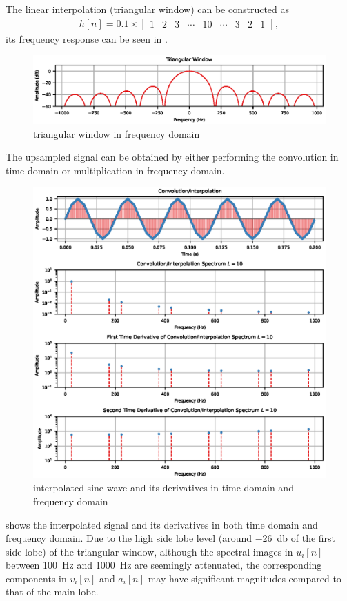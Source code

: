 The linear interpolation (triangular window) can be constructed as
\begin{gather}
h[n]=0.1\times\begin{bmatrix}
1&2&3&\cdots&10&\cdots&3&2&1
\end{bmatrix},
\end{gather}
its frequency response can be seen in .
\begin{figure}[ht]
\centering
\includegraphics{PIC/TriangularWindow}
\caption{triangular window in frequency domain}\label{fig:tri_window}
\end{figure}

The upsampled signal can be obtained by either performing the convolution in time domain or multiplication in frequency domain.
\begin{figure}[ht]
\centering
\includegraphics{PIC/Convolution}
\caption{interpolated sine wave and its derivatives in time domain and frequency domain}\label{fig:interpolated}
\end{figure}
 shows the interpolated signal and its derivatives in both time domain and frequency domain. Due to the high side lobe level (around \SI{-26}{\decibel} of the first side lobe) of the triangular window, although the spectral images in $u_i[n]$ between \SI{100}{\hertz} and \SI{1000}{\hertz} are seemingly attenuated, the corresponding components in $v_i[n]$ and $a_i[n]$ may have significant magnitudes compared to that of the main lobe.

